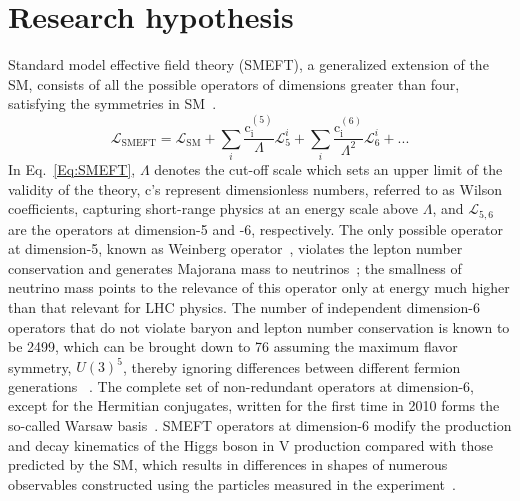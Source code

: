 \documentclass[a4paper,11pt]{article}
\newcommand{\Pb}{{{\Pqb}}\xspace}
\newcommand{\PAb}{{{{\Paqb}}}\xspace}
\renewcommand{\PV}{{{{V}}}\xspace}
\newcommand{\VH}{{{\PV}{\PH}}\xspace}
\begin{document}
\section{Research hypothesis}
\label{sec:research_hypo}


Standard model effective field theory (SMEFT), a generalized extension of the SM, consists of all the possible operators of dimensions greater than four, satisfying the symmetries in SM~\cite{Jenkins:2013zja,Alonso:2013hga,Jenkins:2013wua,Englert:2014cva,Brivio:2017vri}. 
\begin{equation}
\mathcal{L}_{\text{SMEFT}} = \mathcal{L}_{\text{SM}} +  {\sum}_{i} \frac{\text{c}_\text{i}^{\left(5\right)}}{\Lambda} \mathcal{L}_{5}^{i} + {\sum}_{i} \frac{\text{c}_\text{i}^{\left(6\right)}}{{\Lambda}^{2}} \mathcal{L}_{6}^{i} + ...
\label{Eq:SMEFT}
\end{equation}
In Eq.~\eqref{Eq:SMEFT}, $\Lambda$ denotes the cut-off scale which sets an upper limit of the validity of the theory, $\text{c}$'s represent dimensionless numbers, referred to as Wilson coefficients, capturing short-range physics at an energy scale above $\Lambda$, and $\mathcal{L}_{5,6}$ are the operators at dimension-5 and -6, respectively.
The only possible operator at dimension-5, known as Weinberg operator~\cite{PhysRevLett.43.1566}, violates the lepton number conservation and generates Majorana mass to neutrinos~\cite{Bonnet:2009ej}; 
the smallness of neutrino mass points to the relevance of this operator only at energy much higher than that relevant for LHC physics. 
The number of independent dimension-6 operators that do not violate baryon and lepton number conservation is known to be 2499,
which can be brought down to 76 assuming the maximum flavor symmetry, $U(3)^5$, 
thereby ignoring differences between different fermion generations
~\cite{Alonso:2013hga}.
The complete set of non-redundant operators at  dimension-6, except for the Hermitian conjugates, written for the first time in 2010 forms the so-called Warsaw basis~\cite{Grzadkowski:2010es}. 
SMEFT operators at dimension-6 modify the production and decay kinematics of the Higgs boson in \VH production compared with those predicted by the SM, which results in differences in shapes of numerous observables constructed using the particles measured in the experiment~\cite{Hagiwara:1993qt,Ellis:2014dva,Murphy:2017omb,Baglio:2020oqu}. 
\end{document}

